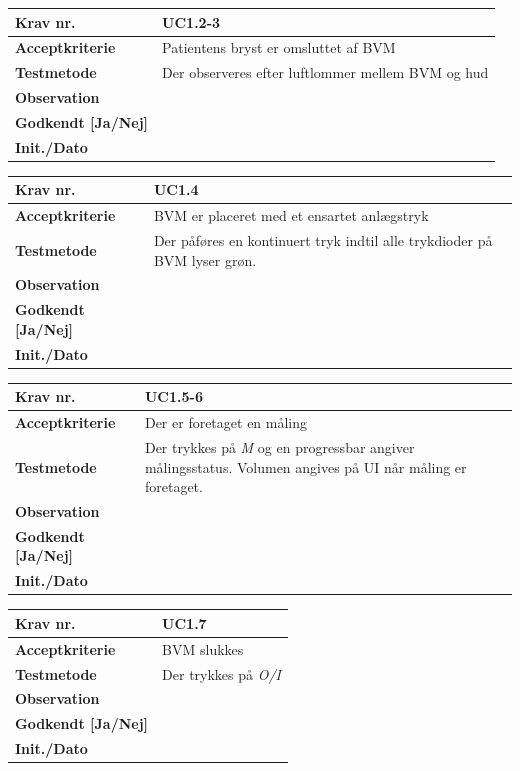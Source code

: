\begin{tabularx}{1\textwidth}{|l|X|}
\hline
\textbf{Krav nr.}              & UC1.2-3  \\ \hline
\textbf{Acceptkriterie}        & Patientens bryst er omsluttet af BVM \\ \hline
\textbf{Testmetode}            & Der observeres efter luftlommer mellem BVM og hud \\ \hline
\textbf{Observation}           &  \\ \hline
\textbf{Godkendt {[}Ja/Nej{]}} &  \\ \hline
\textbf{Init./Dato}            &  \\ \hline
\end{tabularx}
		

\begin{tabularx}{1\textwidth}{|l|X|}
\hline
\textbf{Krav nr.}              & UC1.4  \\ \hline
\textbf{Acceptkriterie}        & BVM er placeret med et ensartet anlægstryk \\ \hline
\textbf{Testmetode}            & Der påføres en kontinuert tryk indtil alle trykdioder på BVM lyser grøn.  \\ \hline
\textbf{Observation}           &  \\ \hline
\textbf{Godkendt {[}Ja/Nej{]}} &  \\ \hline
\textbf{Init./Dato}            &  \\ \hline
\end{tabularx}
		
			

\begin{tabularx}{1\textwidth}{|l|X|}
\hline
\textbf{Krav nr.}              & UC1.5-6  \\ \hline
\textbf{Acceptkriterie}        & Der er foretaget en måling\\ \hline
\textbf{Testmetode}            & Der trykkes på \textit{M} og en progressbar angiver målingsstatus. Volumen angives på UI når måling er foretaget. \\ \hline
\textbf{Observation}           &  \\ \hline
\textbf{Godkendt {[}Ja/Nej{]}} &  \\ \hline
\textbf{Init./Dato}            &  \\ \hline
\end{tabularx}


\begin{tabularx}{1\textwidth}{|l|X|}
\hline
\textbf{Krav nr.}              & UC1.7  \\ \hline
\textbf{Acceptkriterie}        & BVM slukkes\\ \hline
\textbf{Testmetode}            & Der trykkes på \textit{O/I} \\ \hline
\textbf{Observation}           &  \\ \hline
\textbf{Godkendt {[}Ja/Nej{]}} &  \\ \hline
\textbf{Init./Dato}            &  \\ \hline
\end{tabularx}\\
	
